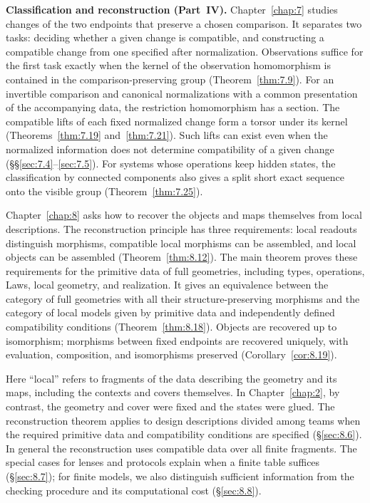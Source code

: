 \textbf{Classification and reconstruction (Part~IV).}
Chapter~\ref{chap:7} studies changes of the two endpoints that preserve a
chosen comparison. It separates two tasks: deciding whether a given change
is compatible, and constructing a compatible change from one specified after
normalization. Observations suffice for the first task exactly when the
kernel of the observation homomorphism is contained in the comparison-preserving
group (Theorem~\ref{thm:7.9}). For an invertible comparison and canonical
normalizations with a common presentation of the accompanying data, the
restriction homomorphism has a section. The compatible lifts of each fixed
normalized change form a torsor under its kernel
(Theorems~\ref{thm:7.19} and~\ref{thm:7.21}). Such lifts can exist even when
the normalized information does not determine compatibility of a given
change (\S\S\ref{sec:7.4}--\ref{sec:7.5}). For systems whose operations keep
hidden states, the classification by connected components also gives a split
short exact sequence onto the visible group (Theorem~\ref{thm:7.25}).

Chapter~\ref{chap:8} asks how to recover the objects and maps themselves
from local descriptions. The reconstruction principle has three requirements:
local readouts distinguish morphisms, compatible local morphisms can be
assembled, and local objects can be assembled (Theorem~\ref{thm:8.12}). The
main theorem proves these requirements for the primitive data of full
geometries, including types, operations, Laws, local geometry, and realization.
It gives an equivalence between the category of full geometries with all
their structure-preserving morphisms and the category of local models given
by primitive data and independently defined compatibility conditions
(Theorem~\ref{thm:8.18}). Objects are recovered up to isomorphism; morphisms
between fixed endpoints are recovered uniquely, with evaluation, composition,
and isomorphisms preserved (Corollary~\ref{cor:8.19}).

Here ``local'' refers to fragments of the data describing the geometry and
its maps, including the contexts and covers themselves. In Chapter~\ref{chap:2},
by contrast, the geometry and cover were fixed and the states were glued.
The reconstruction theorem applies to design descriptions divided among
teams when the required primitive data and compatibility conditions are
specified (\S\ref{sec:8.6}). In general the reconstruction uses compatible
data over all finite fragments. The special cases for lenses and protocols
explain when a finite table suffices (\S\ref{sec:8.7}); for finite models,
we also distinguish sufficient information from the checking procedure and
its computational cost (\S\ref{sec:8.8}).

